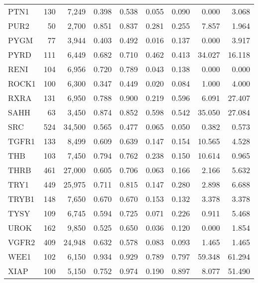 \begin{center}
\begin{longtable}{lrrrrrrrr}
		PTN1   & 130   & 7,249    & 0.398   & 0.538   & 0.055   & 0.090   & 0.000   & 3.068  \\
		PUR2   & 50    & 2,700    & 0.851   & 0.837   & 0.281   & 0.255   & 7.857   & 1.964  \\
		PYGM   & 77    & 3,944    & 0.403   & 0.492   & 0.016   & 0.137   & 0.000   & 3.917  \\
		PYRD   & 111   & 6,449    & 0.682   & 0.710   & 0.462   & 0.413   & 34.027  & 16.118 \\
		RENI   & 104   & 6,956    & 0.720   & 0.789   & 0.043   & 0.138   & 0.000   & 0.000  \\
		ROCK1  & 100   & 6,300    & 0.347   & 0.449   & 0.020   & 0.084   & 1.000   & 4.000  \\
		RXRA   & 131   & 6,950    & 0.788   & 0.900   & 0.219   & 0.596   & 6.091   & 27.407 \\
		SAHH   & 63    & 3,450    & 0.874   & 0.852   & 0.598   & 0.542   & 35.050  & 27.084 \\
		SRC    & 524   & 34,500   & 0.565   & 0.477   & 0.065   & 0.050   & 0.382   & 0.573  \\
		TGFR1  & 133   & 8,499    & 0.609   & 0.639   & 0.147   & 0.154   & 10.565  & 4.528  \\
		THB    & 103   & 7,450    & 0.794   & 0.762   & 0.238   & 0.150   & 10.614  & 0.965  \\
		THRB   & 461   & 27,000   & 0.605   & 0.706   & 0.063   & 0.166   & 2.166   & 5.632  \\
		TRY1   & 449   & 25,975   & 0.711   & 0.815   & 0.147   & 0.280   & 2.898   & 6.688  \\
		TRYB1  & 148   & 7,650    & 0.670   & 0.670   & 0.153   & 0.132   & 3.378   & 3.378  \\
		TYSY   & 109   & 6,745    & 0.594   & 0.725   & 0.071   & 0.226   & 0.911   & 5.468  \\
		UROK   & 162   & 9,850    & 0.525   & 0.650   & 0.036   & 0.120   & 0.000   & 1.854  \\
		VGFR2  & 409   & 24,948   & 0.632   & 0.578   & 0.083   & 0.093   & 1.465   & 1.465  \\
		WEE1   & 102   & 6,150    & 0.934   & 0.929   & 0.789   & 0.797   & 59.348  & 61.294 \\
		XIAP   & 100   & 5,150    & 0.752   & 0.974   & 0.190   & 0.897   & 8.077   & 51.490 \\
		\bottomrule
	\end{longtable}
	
	\endgroup
\end{center}

